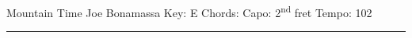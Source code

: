 \documentclass[a4paper, 12pt]{article}
\begin{document}
 
\LARGE Mountain Time \hfill  Joe Bonamassa \newline\tiny\newline\small 
\hfill Key: E \hfill\hfill Chords: \hspace{0.2cm} \hspace{0.2cm} \hspace{0.2cm} \hspace{0.2cm} \hspace{0.2cm} \hspace{0.2cm}  \hfill\hfill \hfill Capo: 2\textsuperscript{nd} fret \hfill \hfill  \hfill Tempo: 102\newline\rule{\linewidth}{0.3pt}\newline \large \bfseries 


 \centering 
\end{document}

